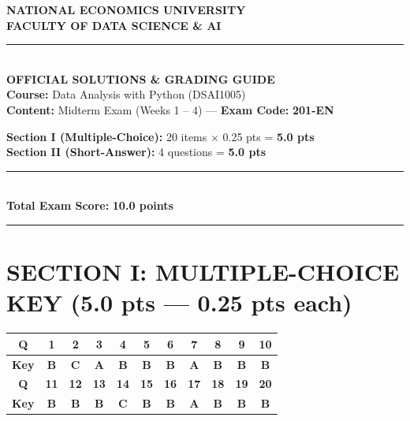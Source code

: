 \documentclass[11pt,a4paper]{article}
\begin{document}
\noindent
\begin{minipage}[t]{0.55\textwidth}
  \centering
  \textbf{NATIONAL ECONOMICS UNIVERSITY}\\
  \textbf{FACULTY OF DATA SCIENCE \& AI}\\
  \rule{4.5cm}{0.4pt}\\[2mm]
  \textbf{OFFICIAL SOLUTIONS \& GRADING GUIDE}\\
  \textbf{Course:} Data Analysis with Python (DSAI1005)\\
  \textbf{Content:} Midterm Exam (Weeks 1 -- 4) --- \textbf{Exam Code:} \textbf{201-EN}
\end{minipage}
\hfill
\begin{minipage}[t]{0.42\textwidth}
  \begin{tcolorbox}[colback=blue!5!white,colframe=blue!75!black,title=\textbf{Score Breakdown (10-Point Scale)}]
    \small
    \textbf{Section I (Multiple-Choice):} 20 items $\times$ 0.25 pts = \textbf{5.0 pts}\\
    \textbf{Section II (Short-Answer):} 4 questions = \textbf{5.0 pts}\\
    \rule{\linewidth}{0.3pt}\\
    \textbf{Total Exam Score:} \textbf{10.0 points}
  \end{tcolorbox}
\end{minipage}

\vspace{3mm}
\hrule
\vspace{2mm}

\section*{SECTION I: MULTIPLE-CHOICE KEY (5.0 pts --- 0.25 pts each)}

\begin{center}
\begin{tabular}{|c|c|c|c|c|c|c|c|c|c|c|}
  \hline
  \textbf{Q} & \textbf{1} & \textbf{2} & \textbf{3} & \textbf{4} & \textbf{5} & \textbf{6} & \textbf{7} & \textbf{8} & \textbf{9} & \textbf{10} \\
  \hline
  \textbf{Key} & \textbf{B} & \textbf{C} & \textbf{A} & \textbf{B} & \textbf{B} & \textbf{B} & \textbf{A} & \textbf{B} & \textbf{B} & \textbf{B} \\
  \hline
  \hline
  \textbf{Q} & \textbf{11} & \textbf{12} & \textbf{13} & \textbf{14} & \textbf{15} & \textbf{16} & \textbf{17} & \textbf{18} & \textbf{19} & \textbf{20} \\
  \hline
  \textbf{Key} & \textbf{B} & \textbf{B} & \textbf{B} & \textbf{C} & \textbf{B} & \textbf{B} & \textbf{A} & \textbf{B} & \textbf{B} & \textbf{B} \\
  \hline
\end{tabular}
\end{center}
\end{document}
